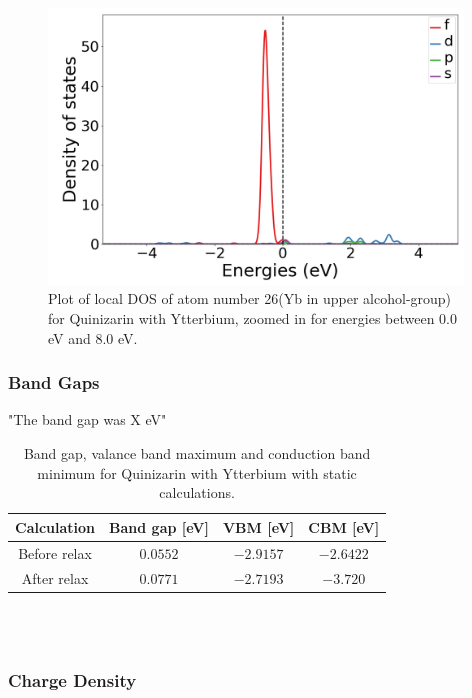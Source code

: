 \documentclass{article}
\begin{document}
      \begin{figure}[H]
          \centering
          \includegraphics[width = 11cm]{../fig/Yb_LDOS26_2.png}
          \caption{Plot of local DOS of atom number 26(Yb in upper alcohol-group) for Quinizarin with Ytterbium, zoomed in for energies between 0.0 eV and 8.0 eV. }
          \label{fig:Yb_LDOS26_2.png}
      \end{figure}



    \subsubsection{Band Gaps}

      "The band gap was X eV"

      \begin{table}[H]
        \centering
        \caption{Band gap, valance band maximum and conduction band minimum for Quinizarin with Ytterbium with static calculations. }
        \vspace{0mm}
        \label{tab:bandgapYb}
        \begin{tabular}{|c|c|c|c|}
            \hline
            Calculation & Band gap [eV] & VBM [eV] & CBM [eV]  \\
            \hline \hline
            Before relax & $0.0552$ & $-2.9157$ & $-2.6422$ \\
            After relax & $0.0771$ & $-2.7193$ & $-3.720$ \\
            \hline
        \end{tabular} \\
        \hspace{0pt}\\
      \end{table}

    \subsubsection{Charge Density}
\end{document}
